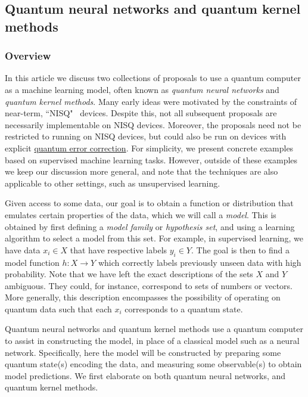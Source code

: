 \begin{refsection}
\subsection{Quantum neural networks and quantum kernel methods}\label{appl:NearTermML}


\subsubsection*{Overview}
In this article we discuss two collections of proposals to use a quantum computer as a machine learning model, often known as \textit{quantum neural networks} and \textit{quantum kernel methods}. Many early ideas were motivated by the constraints of near-term, ``NISQ"~\cite{preskill2018QuantCompNISQEra} devices.
Despite this, not all subsequent proposals are necessarily implementable on NISQ devices. Moreover, the proposals need not be restricted to running on NISQ devices, but could also be run on devices with explicit \hyperref[prim:QEC]{quantum error correction}. For simplicity, we present concrete examples based on supervised machine learning tasks. However, outside of these examples we keep our discussion more general, and note that the techniques are also applicable to other settings, such as unsupervised learning.

Given access to some data, our goal is to obtain a function or distribution that emulates certain properties of the data, which we will call a \textit{model}. This is obtained by first defining a \textit{model family} or \textit{hypothesis set}, and using a learning algorithm to select a model from this set. For example, in supervised learning, we have data $x_i \in X$ that have respective labels $y_i \in Y$. The goal is then to find a model function $h: X \rightarrow Y$ which correctly labels previously unseen data with high probability. Note that we have left the exact descriptions of the sets $X$ and $Y$ ambiguous. They could, for instance, correspond to sets of numbers or vectors. More generally, this description encompasses the possibility of operating on quantum data such that each $x_i$ corresponds to a quantum state. 

Quantum neural networks and quantum kernel methods use a quantum computer to assist in constructing the model, in place of a classical model such as a neural network. Specifically, here the model will be constructed by preparing some quantum state(s) encoding the data, and measuring some observable(s) to obtain model predictions. We first elaborate on both quantum neural networks, and quantum kernel methods.



\end{refsection}
